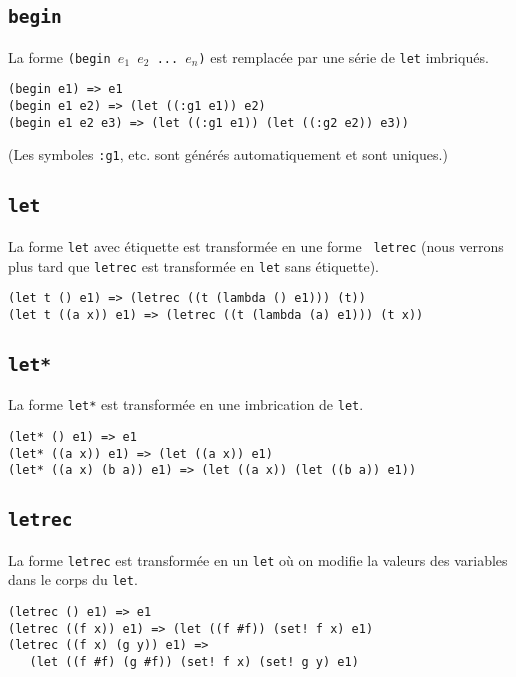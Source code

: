 \documentclass[11pt]{report}
\begin{document}
\subsection{\tt begin}

La forme {\tt (begin $e_1$ $e_2$ ... $e_n$)} est remplacée par une
série de {\tt let} imbriqués.


\begin{verbatim}
(begin e1) => e1
(begin e1 e2) => (let ((:g1 e1)) e2)
(begin e1 e2 e3) => (let ((:g1 e1)) (let ((:g2 e2)) e3))
\end{verbatim}

(Les symboles {\tt :g1}, etc. sont générés automatiquement et sont
uniques.)

\subsection{\tt let}

La forme {\tt let} avec étiquette est transformée en une forme {\tt
  letrec} (nous verrons plus tard que {\tt letrec} est transformée
en {\tt let} sans étiquette).

\begin{verbatim}
(let t () e1) => (letrec ((t (lambda () e1))) (t))
(let t ((a x)) e1) => (letrec ((t (lambda (a) e1))) (t x))
\end{verbatim}


\subsection{\tt let*}

La forme {\tt let*} est transformée en une imbrication de {\tt let}.

\begin{verbatim}
(let* () e1) => e1
(let* ((a x)) e1) => (let ((a x)) e1)
(let* ((a x) (b a)) e1) => (let ((a x)) (let ((b a)) e1))
\end{verbatim}


\subsection{\tt letrec}

La forme {\tt letrec} est transformée en un {\tt let} où on modifie la
valeurs des variables dans le corps du {\tt let}.

\begin{verbatim}
(letrec () e1) => e1
(letrec ((f x)) e1) => (let ((f #f)) (set! f x) e1)
(letrec ((f x) (g y)) e1) =>
   (let ((f #f) (g #f)) (set! f x) (set! g y) e1)
\end{verbatim}
\end{document}
